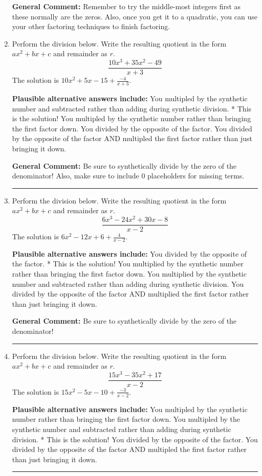 \documentclass{extbook}[14pt]
\newcommand{\litem}[1]{\item #1

\rule{\textwidth}{0.4pt}}
\begin{document}
\begin{enumerate}
{\textbf{General Comment:} Remember to try the middle-most integers first as these normally are the zeros. Also, once you get it to a quadratic, you can use your other factoring techniques to finish factoring.
}
\litem{
Perform the division below. Write the resulting quotient in the form $ax^2+bx+c$ and remainder as $r$.
\[ \frac{10x^{3} +35 x^{2} -49}{x + 3} \]The solution is \( 10x^{2} +5 x -15 + \frac{-4}{x + 3} \).\begin{enumerate}[label=\Alph*.]
\textbf{Plausible alternative answers include:} You multipled by the synthetic number and subtracted rather than adding during synthetic division.
* This is the solution!
 You multipled by the synthetic number rather than bringing the first factor down.
 You divided by the opposite of the factor.
 You divided by the opposite of the factor AND multipled the first factor rather than just bringing it down.
\end{enumerate}

\textbf{General Comment:} Be sure to synthetically divide by the zero of the denominator! Also, make sure to include 0 placeholders for missing terms.
}
\litem{
Perform the division below. Write the resulting quotient in the form $ax^2+bx+c$ and remainder as $r$.
\[ \frac{6x^{3} -24 x^{2} +30 x -8}{x -2} \]The solution is \( 6x^{2} -12 x + 6 + \frac{4}{x -2} \).\begin{enumerate}[label=\Alph*.]
\textbf{Plausible alternative answers include:} You divided by the opposite of the factor.
* This is the solution!
 You multiplied by the synthetic number rather than bringing the first factor down.
 You multiplied by the synthetic number and subtracted rather than adding during synthetic division.
 You divided by the opposite of the factor AND multiplied the first factor rather than just bringing it down.
\end{enumerate}

\textbf{General Comment:} Be sure to synthetically divide by the zero of the denominator!
}
\litem{
Perform the division below. Write the resulting quotient in the form $ax^2+bx+c$ and remainder as $r$.
\[ \frac{15x^{3} -35 x^{2} + 17}{x -2} \]The solution is \( 15x^{2} -5 x -10 + \frac{-3}{x -2} \).\begin{enumerate}[label=\Alph*.]
\textbf{Plausible alternative answers include:} You multipled by the synthetic number rather than bringing the first factor down.
 You multipled by the synthetic number and subtracted rather than adding during synthetic division.
* This is the solution!
 You divided by the opposite of the factor.
 You divided by the opposite of the factor AND multipled the first factor rather than just bringing it down.
\end{enumerate}

}
\end{enumerate}
\end{document}

